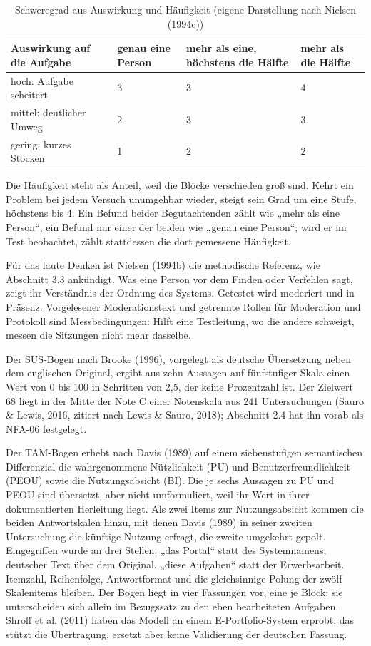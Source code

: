 \begin{table}[htbp]
	\centering
	\small
	\caption[Schweregrad aus Auswirkung und Häufigkeit]{Schweregrad aus Auswirkung und Häufigkeit (eigene Darstellung nach Nielsen (1994c))}
	\label{tab:schweregrad}
	\begin{tabularx}{\textwidth}{@{}L{4.6cm}YYY@{}}
		\toprule
		\textbf{Auswirkung auf die Aufgabe} & \textbf{genau eine Person} & \textbf{mehr als eine, höchstens die Hälfte} & \textbf{mehr als die Hälfte} \\
		\midrule
		hoch: Aufgabe scheitert & 3 & 3 & 4 \\
		mittel: deutlicher Umweg & 2 & 3 & 3 \\
		gering: kurzes Stocken & 1 & 2 & 2 \\
		\bottomrule
	\end{tabularx}
\end{table}

Die Häufigkeit steht als Anteil, weil die Blöcke verschieden groß sind. Kehrt ein Problem bei jedem Versuch unumgehbar wieder, steigt sein Grad um eine Stufe, höchstens bis 4. Ein Befund beider Begutachtenden zählt wie „mehr als eine Person“, ein Befund nur einer der beiden wie „genau eine Person“; wird er im Test beobachtet, zählt stattdessen die dort gemessene Häufigkeit.

Für das laute Denken ist Nielsen (1994b) die methodische Referenz, wie Abschnitt 3.3 ankündigt. Was eine Person vor dem Finden oder Verfehlen sagt, zeigt ihr Verständnis der Ordnung des Systems. Getestet wird moderiert und in Präsenz. Vorgelesener Moderationstext und getrennte Rollen für Moderation und Protokoll sind Messbedingungen: Hilft eine Testleitung, wo die andere schweigt, messen die Sitzungen nicht mehr dasselbe.

Der SUS-Bogen nach Brooke (1996), vorgelegt als deutsche Übersetzung neben dem englischen Original, ergibt aus zehn Aussagen auf fünfstufiger Skala einen Wert von 0 bis 100 in Schritten von 2,5, der keine Prozentzahl ist. Der Zielwert 68 liegt in der Mitte der Note C einer Notenskala aus 241 Untersuchungen (Sauro \& Lewis, 2016, zitiert nach Lewis \& Sauro, 2018); Abschnitt 2.4 hat ihn vorab als NFA-06 festgelegt.

Der TAM-Bogen erhebt nach Davis (1989) auf einem siebenstufigen semantischen Differenzial die wahrgenommene Nützlichkeit (PU) und Benutzerfreundlichkeit (PEOU) sowie die Nutzungsabsicht (BI). Die je sechs Aussagen zu PU und PEOU sind übersetzt, aber nicht umformuliert, weil ihr Wert in ihrer dokumentierten Herleitung liegt. Als zwei Items zur Nutzungsabsicht kommen die beiden Antwortskalen hinzu, mit denen Davis (1989) in seiner zweiten Untersuchung die künftige Nutzung erfragt, die zweite umgekehrt gepolt. Eingegriffen wurde an drei Stellen: „das Portal“ statt des Systemnamens, deutscher Text über dem Original, „diese Aufgaben“ statt der Erwerbsarbeit. Itemzahl, Reihenfolge, Antwortformat und die gleichsinnige Polung der zwölf Skalenitems bleiben. Der Bogen liegt in vier Fassungen vor, eine je Block; sie unterscheiden sich allein im Bezugssatz zu den eben bearbeiteten Aufgaben. Shroff et al. (2011) haben das Modell an einem E-Portfolio-System erprobt; das stützt die Übertragung, ersetzt aber keine Validierung der deutschen Fassung.

